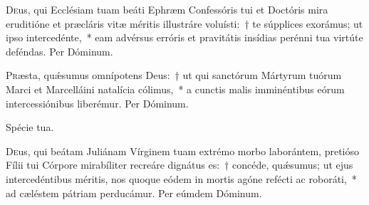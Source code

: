 \documentclass[vesperale_romanum.tex]{subfiles}
\begin{document}
\myrule


\duplex

\odoctoroptime

\oratio

\lettrine{D}{e}us, qui Ecclésiam tuam beáti Ephræm Confessóris tui et Doctóris mira eruditióne et præcláris vitæ méritis illustráre voluísti:~† te súpplices exorámus; ut i\-pso intercedénte,~* eam advérsus erróris et pravitátis insídias perénni tua virtúte deféndas.
Per Dóminum.


\oratio

\lettrine{P}{r}æsta, quǽsumus omnípotens Deus:~† ut qui san\-ctórum Mártyrum tuórum Marci et Marcelláini natalícia cólimus,~* a cunctis malis imminéntibus eórum intercessiónibus liberémur. Per Dóminum.


\myrule


\duplex


\hymnus


\vv Spécie tua.


\oratio

\lettrine{D}{e}us, qui beátam Juliánam Vírginem tuam extrémo morbo laborántem, pretióso Fílii tui Córpore mirabíliter recreáre dignátus es:~† concéde, quǽsumus; ut ejus intercedéntibus méritis, nos quoque eódem in mortis agóne refé\-cti ac roboráti,~* ad cæléstem pátriam perducámur. Per eúmdem Dóminum.


\end{document}
